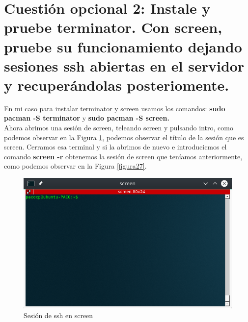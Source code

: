 
\section{Cuestión opcional 2: Instale y pruebe terminator. Con screen, pruebe su funcionamiento dejando sesiones ssh abiertas en el servidor y recuperándolas posteriomente.}
 
En mi caso para instalar terminator y screen\cite{screen} usamos los comandos: \textbf{sudo pacman -S terminator} y \textbf{sudo pacman -S screen.}\\
Ahora abrimos una sesión de screen, teleando screen y pulsando intro, como podemos observar en la Figura \ref{figura26}, podemos observar el título de la sesión que es screen. Cerramos esa terminal y si la abrimos de nuevo e introducicmos el comando \textbf{screen -r} obtenemos la sesión de screen que teníamos anteriormente, como podemos observar en la Figura \ref{figura27}.
\begin{figure}[H] %
	\centering
	\includegraphics[scale=0.5]{figuras/firgura26.png}  %
	
	
	\caption{Sesión de ssh en screen}
	\label{figura26}
\end{figure}

